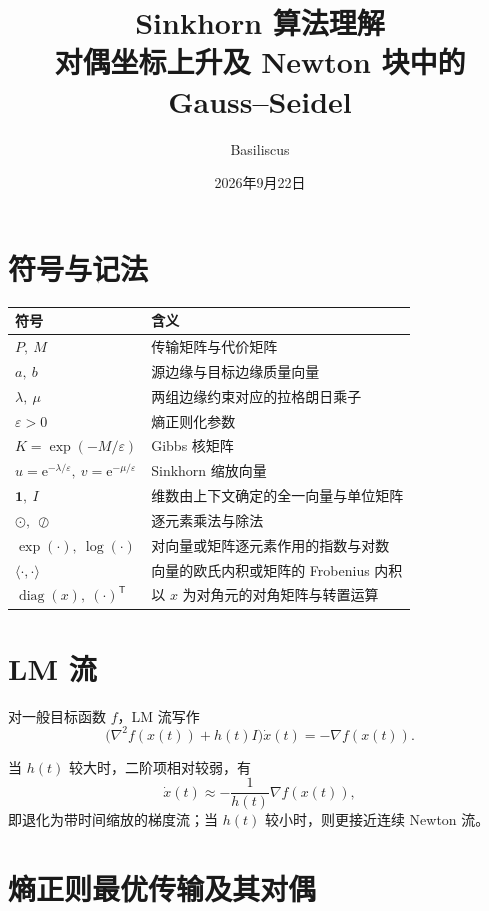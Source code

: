 \documentclass[11pt,a4paper]{ctexart}
\title{ Sinkhorn 算法理解\\[0.4em]
\large 对偶坐标上升及 Newton 块中的 Gauss--Seidel}
\author{Basiliscus}
\date{2026年9月22日}
\newcommand{\diag}{\operatorname{diag}}
\newcommand{\e}{\mathrm{e}}
\newcommand{\vone}{\bm{1}}
\newcommand{\trans}{\mathsf{T}}
\begin{document}
\maketitle
\vspace{-2.2em}

\section*{符号与记法}
\begingroup
\small
\renewcommand{\arraystretch}{1.18}
\noindent
\begin{tabular*}{\textwidth}{@{}l@{\extracolsep{\fill}}l@{}}
\toprule
\textbf{符号} & \textbf{含义} \\
\midrule
$P,\ M$ & 传输矩阵与代价矩阵 \\
$a,\ b$ & 源边缘与目标边缘质量向量 \\
$\lambda,\ \mu$ & 两组边缘约束对应的拉格朗日乘子 \\
$\varepsilon>0$ & 熵正则化参数 \\
$K=\exp(-M/\varepsilon)$ & Gibbs 核矩阵 \\
$u=\e^{-\lambda/\varepsilon},\ v=\e^{-\mu/\varepsilon}$ & Sinkhorn 缩放向量 \\
$\vone,\ I$ & 维数由上下文确定的全一向量与单位矩阵 \\
$\odot,\ \oslash$ & 逐元素乘法与除法 \\
$\exp(\cdot),\ \log(\cdot)$ & 对向量或矩阵逐元素作用的指数与对数 \\
$\langle\cdot,\cdot\rangle$ & 向量的欧氏内积或矩阵的 Frobenius 内积 \\
$\diag(x),\ (\cdot)^{\trans}$ & 以 $x$ 为对角元的对角矩阵与转置运算 \\
\bottomrule
\end{tabular*}
\par
\endgroup

\section{LM 流}

对一般目标函数 $f$，LM 流写作
\begin{equation}
  \bigl(\nabla^2 f(x(t))+h(t)I\bigr)\dot{x}(t)
  =-\nabla f(x(t)).
\end{equation}

当 $h(t)$ 较大时，二阶项相对较弱，有
\[
  \dot{x}(t)\approx-\frac{1}{h(t)}\nabla f(x(t)),
\]
即退化为带时间缩放的梯度流；当 $h(t)$ 较小时，则更接近连续 Newton 流。

\section{熵正则最优传输及其对偶}
\end{document}
